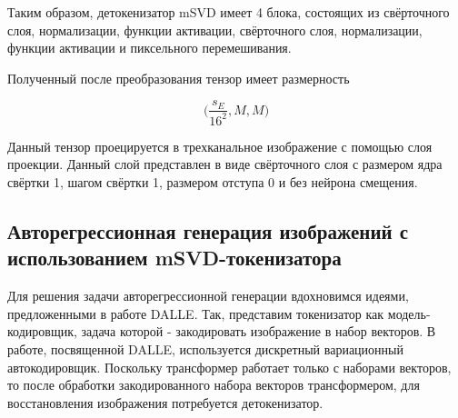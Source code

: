 \documentclass[times,specification,annotation]{itmo-student-thesis}
\begin{document}
Таким образом, детокенизатор mSVD имеет 4 блока, состоящих из свёрточного слоя, нормализации, функции активации, свёрточного слоя, нормализации, функции активации и пиксельного перемешивания.

Полученный после преобразования тензор имеет размерность 

$$
\Big(\dfrac{s_E}{16^2},  M, M\Big)
$$

Данный тензор проецируется в трехканальное изображение с помощью слоя проекции. Данный слой представлен в виде свёрточного слоя с размером ядра свёртки 1, шагом свёртки 1, размером отступа 0 и без нейрона смещения.






\subsection{Авторегрессионная генерация изображений с использованием mSVD-токенизатора}

Для решения задачи авторегрессионной генерации вдохновимся идеями, предложенными в работе DALLE. Так, представим токенизатор как модель-кодировщик, задача которой - закодировать изображение в набор векторов. В работе, посвященной DALLE, используется дискретный вариационный автокодировщик. Поскольку трансформер работает только с наборами векторов, то после обработки закодированного набора векторов трансформером, для восстановления изображения потребуется детокенизатор.





\end{document}

